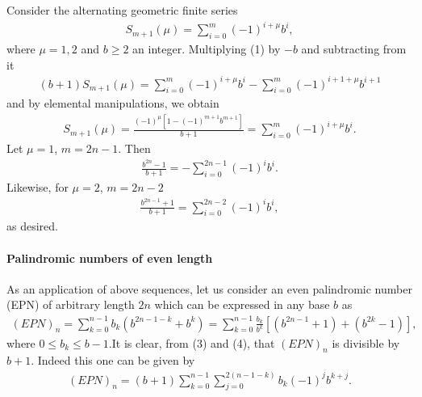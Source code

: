 \documentclass[12pt]{article}
\begin{document}
Consider the alternating geometric finite series
\begin{align}
S_{m+1}(\mu)=\sum_{i=0}^m(-1)^{i+\mu}b^i,
\end{align} 
where $\mu=1,2$ and $b\geq 2$ an integer. Multiplying (1) by $-b$ and subtracting from it
\begin{align*}
(b+1)S_{m+1}(\mu)=\sum_{i=0}^m(-1)^{i+\mu}b^i-\sum_{i=0}^m(-1)^{i+1+\mu}b^{i+1}
\end{align*}
and by elemental manipulations, we obtain
\begin{align}
S_{m+1}(\mu)=\frac{(-1)^\mu[1-(-1)^{m+1}b^{m+1}]}{b+1}=
\sum_{i=0}^m(-1)^{i+\mu}b^i.
\end{align}
Let $\mu=1$, $m=2n-1$. Then
\begin{align}
\frac{b^{2n}-1}{b+1}=-\sum_{i=0}^{2n-1}(-1)^ib^i.
\end{align}
Likewise, for $\mu=2$, $m=2n-2$
\begin{align}
\frac{b^{2n-1}+1}{b+1}=\sum_{i=0}^{2n-2}(-1)^ib^i,
\end{align}
as desired.
\paragraph{Palindromic numbers of even length}
As an application of above sequences, let us consider an even palindromic number (EPN) of arbitrary length $2n$ which can be expressed in any base $b$ as
\begin{align}
(EPN)_n=\sum_{k=0}^{n-1}b_k(b^{2n-1-k}+b^k)=
\sum_{k=0}^{n-1}\frac{b_k}{b^k}[(b^{2n-1}+1)+(b^{2k}-1)],
\end{align}
where $0\leq b_k\leq b-1$.It is clear, from (3) and (4), that $(EPN)_n$ is divisible by $b+1$. Indeed this one can be given by
\begin{align}
(EPN)_n=(b+1)\sum_{k=0}^{n-1}\sum_{j=0}^{2(n-1-k)}b_k(-1)^jb^{k+j}.
\end{align} 


\end{document}
